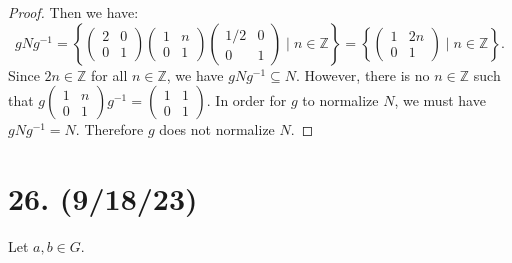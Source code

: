 \documentclass{article}
\begin{document}
\begin{enumerate}[label=(\alph*), itemsep=0em]
\begin{proof}
            Then we have:
            \begin{equation*}
                gNg^{-1} = \left\{ \begin{pmatrix}2 & 0 \\ 0 & 1 \end{pmatrix}\begin{pmatrix}1 & n \\ 0 & 1 \end{pmatrix}\begin{pmatrix}1/2 & 0 \\ 0 & 1 \end{pmatrix} \mid n \in \mathbb{Z} \right\} = \left\{ \begin{pmatrix}1 & 2n \\ 0 & 1\end{pmatrix} \mid n \in \mathbb{Z} \right\}.
            \end{equation*}
            Since $2n \in \mathbb{Z}$ for all $n \in \mathbb{Z}$, we have $gNg^{-1} \subseteq N$. However, there is no $n \in \mathbb{Z}$ such that $g \begin{pmatrix}1 & n \\ 0 & 1 \end{pmatrix} g^{-1} = \begin{pmatrix}1 & 1 \\ 0 & 1\end{pmatrix}$. In order for $g$ to normalize $N$, we must have $gNg^{-1} = N$. Therefore $g$ does not normalize $N$.
          \end{proof}
\end{enumerate}

\section*{26. (9/18/23)}

Let $a, b \in G$.
\end{document}
